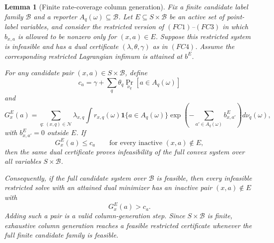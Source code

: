 \documentclass[10pt]{article}
\newtheorem{lemma}[theorem]{Lemma}
\theoremstyle{definition}
\begin{document}
\begin{lemma}[Finite rate-coverage column generation]
   \label{lem:finite-rate-coverage-column-generation}
   Fix a finite candidate label family \(\mathcal B\) and a reporter
   \(A_q(\omega)\subseteq\mathcal B\).  Let
   \(E\subseteq S\times\mathcal B\) be an active set of point-label variables,
   and consider the restricted version of \((FC1)\)--\((FC3)\) in which
   \(b_{x,a}\) is allowed to be nonzero only for \((x,a)\in E\).  Suppose this
   restricted system is infeasible and has a dual certificate
   \((\lambda,\theta,\gamma)\) as in \((FC4)\).  Assume the corresponding
   restricted Lagrangian infimum is attained at \(b^E\).

   For any candidate pair \((x,a)\in S\times\mathcal B\), define
   \[
      c_a=\gamma+\sum_q\theta_q\Pr_{\nu_q}[a\in A_q(\omega)]
      \tag{GC0}
   \]
   and
   \[
      G_x^E(a)
      =
      \sum_{q:\,(x,q)\in\mathcal N}
      \lambda_{x,q}
      \int
      r_{x,q}(\omega)\mathbf 1\{a\in A_q(\omega)\}
      \exp\!\left(
         -\sum_{a'\in A_q(\omega)}b^E_{x,a'}
      \right)d\nu_q(\omega),
      \tag{GC1}
   \]
   with \(b^E_{x,a'}=0\) outside \(E\).  If
   \[
      G_x^E(a)\le c_a
      \qquad\text{for every inactive }(x,a)\notin E,
      \tag{GC2}
   \]
   then the same dual certificate proves infeasibility of the full convex system
   over all variables \(S\times\mathcal B\).

   Consequently, if the full candidate system over \(\mathcal B\) is feasible,
   then every infeasible restricted solve with an attained dual minimizer has an
   inactive pair \((x,a)\notin E\) with
   \[
      G_x^E(a)>c_a .
      \tag{GC3}
   \]
   Adding such a pair is a valid column-generation step.  Since
   \(S\times\mathcal B\) is finite, exhaustive column generation reaches a
   feasible restricted certificate whenever the full finite candidate family is
   feasible.
\end{lemma}
\end{document}
